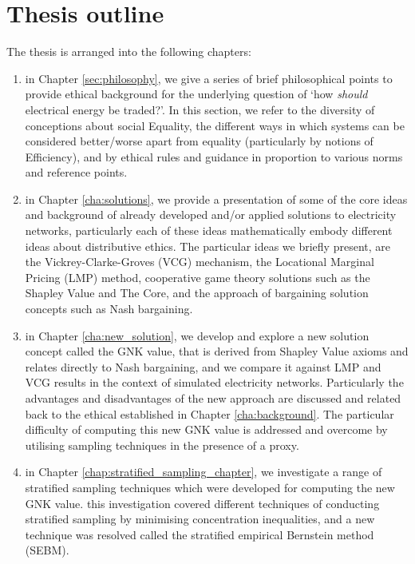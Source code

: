 \DIFaddend \section{Thesis outline}
The thesis is arranged into the following chapters:
\begin{enumerate}
\item in Chapter \ref{sec:philosophy}, we give a series of brief philosophical points to provide ethical background for the underlying question of `how \textit{should} electrical energy be traded?'. In this section, we refer to the diversity of conceptions about social Equality, the different ways in which systems can be considered better/worse apart from equality (particularly by notions of Efficiency), and by ethical rules and guidance in proportion to various norms and reference points. 
\item in Chapter \ref{cha:solutions}, we provide a presentation of some of the core ideas and background of already developed and/or applied solutions to electricity networks, particularly each of these ideas mathematically embody different ideas about distributive ethics. The particular ideas we briefly present, are the Vickrey-Clarke-Groves (VCG) mechanism, the Locational Marginal Pricing (LMP) method, cooperative game theory solutions such as the Shapley Value and The Core, and the approach of bargaining solution concepts such as Nash bargaining. 
\item in Chapter \ref{cha:new_solution}, we develop and explore a new solution concept called the GNK value, that is derived from Shapley Value axioms and relates directly to Nash bargaining, and we compare it against LMP and VCG results in the context of simulated electricity networks. Particularly the advantages and disadvantages of the new approach are discussed and related back to the ethical \DIFdelbegin {}\DIFdelend \DIFaddbegin {}\DIFaddend established in Chapter \ref{cha:background}. The particular difficulty of computing this new GNK value is addressed and overcome by utilising sampling techniques in the presence of a proxy.
\item in Chapter \ref{chap:stratified_sampling_chapter}, we investigate a range of stratified sampling techniques which were developed for computing the new GNK value. this investigation covered different techniques of conducting stratified sampling by minimising concentration inequalities, and a new technique was resolved called the stratified empirical Bernstein method (SEBM).
\end{enumerate}




